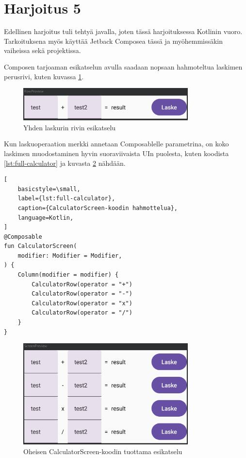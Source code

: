 \section{Harjoitus 5}

Edellinen harjoitus tuli tehtyä javalla, joten tässä harjoituksessa Kotlinin
vuoro. Tarkoituksena myös käyttää Jetback Composea tässä ja myöhemmissäkin
vaiheissa sekä projektissa.

Composen tarjoaman esikatselun avulla saadaan nopsaan hahmoteltua laskimen
perusrivi, kuten kuvassa \ref{fig:exercise-5-row-preview}.

\begin{figure}[h!]
    \centering
    \includegraphics[width=0.8\textwidth]{figures/exercise-5-row-preview.png}
    \caption{Yhden laskurin rivin esikatselu}
    \label{fig:exercise-5-row-preview}
\end{figure}

Kun laskuoperaation merkki annetaan Composablelle parametrina, on koko laskimen
muodostaminen hyvin suoraviivaista UIn puolesta, kuten koodista
\ref{lst:full-calculator} ja kuvasta \ref{fig:exercise-5-calculator-preview}
nähdään.

\begin{lstlisting}[
    basicstyle=\small,
    label={lst:full-calculator},
    caption={CalculatorScreen-koodin hahmottelua},
    language=Kotlin,
]
@Composable
fun CalculatorScreen(
    modifier: Modifier = Modifier,
) {
    Column(modifier = modifier) {
        CalculatorRow(operator = "+")
        CalculatorRow(operator = "-")
        CalculatorRow(operator = "x")
        CalculatorRow(operator = "/")
    }
}
\end{lstlisting}

\begin{figure}[h!]
    \centering
    \includegraphics[width=0.8\textwidth]{figures/exercise-5-calculator-preview.png}
    \caption{Oheisen CalculatorScreen-koodin tuottama esikatselu}
    \label{fig:exercise-5-calculator-preview}
\end{figure}

